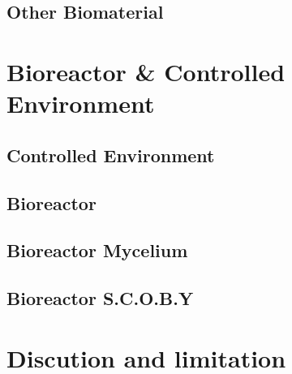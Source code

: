 \subsection{Other Biomaterial}




















\section{Bioreactor \& Controlled Environment }

\subsection{Controlled Environment} 



















\subsection{Bioreactor}
\subsection{Bioreactor Mycelium}
\subsection{Bioreactor S.C.O.B.Y}


\section{Discution and limitation}